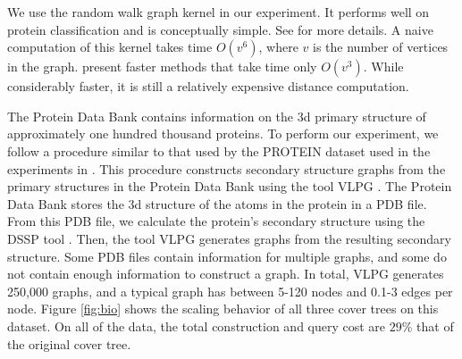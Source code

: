 \documentclass[thesis.tex]{subfiles}
\begin{document}
We use the random walk graph kernel in our experiment.
It performs well on protein classification and is conceptually simple.
See \citet{Vishwanathan2010} for more details.
A naive computation of this kernel takes time $O(v^6)$, where $v$ is the number of vertices in the graph.
\citet{Vishwanathan2010} present faster methods that take time only $O(v^3)$.
While considerably faster, it is still a relatively expensive distance computation.

The Protein Data Bank \citep{Berman2000} contains information on the 3d primary structure of approximately one hundred thousand proteins.
To perform our experiment, we follow a procedure similar to that used by the PROTEIN dataset used in the experiments in \citet{Vishwanathan2010}.
This procedure constructs secondary structure graphs from the primary structures in the Protein Data Bank
using the tool VLPG \citep{Schfer2012}.
The Protein Data Bank stores the 3d structure of the atoms in the protein in a PDB file.
From this PDB file, we calculate the protein's secondary structure using the DSSP tool \citep{Joosten11}.
Then, the tool VLPG \citep{Schfer2012} generates graphs from the resulting secondary structure.
Some PDB files contain information for multiple graphs, and some do not contain enough information to construct a graph.
In total, VLPG generates 250,000 graphs, and a typical graph has between 5-120 nodes and 0.1-3 edges per node.
Figure \ref{fig:bio} shows the scaling behavior of all three cover trees on this dataset.
On all of the data, the total construction and query cost are $29$\% that of the original cover tree.
\end{document}
